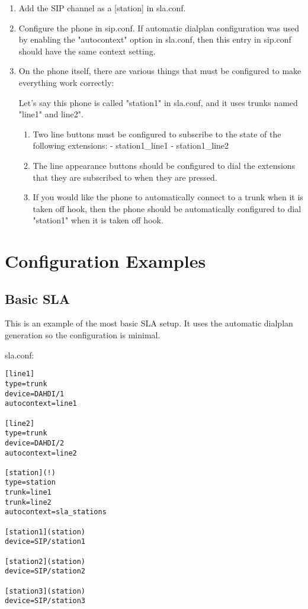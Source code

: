 \begin{enumerate}
\item Add the SIP channel as a [station] in sla.conf.

\item Configure the phone in sip.conf.  If automatic dialplan configuration was
   used by enabling the "autocontext" option in sla.conf, then this entry in
   sip.conf should have the same context setting.

\item On the phone itself, there are various things that must be configured to
   make everything work correctly:

   Let's say this phone is called "station1" in sla.conf, and it uses trunks
   named "line1" and line2".
   \begin{enumerate}

   \item Two line buttons must be configured to subscribe to the state of the
      following extensions:
        - station1\_line1
        - station1\_line2

   \item The line appearance buttons should be configured to dial the extensions
      that they are subscribed to when they are pressed.

   \item If you would like the phone to automatically connect to a trunk when it
      is taken off hook, then the phone should be automatically configured to
      dial "station1" when it is taken off hook.
	
   \end{enumerate}	
\end{enumerate}


\section{Configuration Examples}
\subsection{Basic SLA}

This is an example of the most basic SLA setup.  It uses the automatic
dialplan generation so the configuration is minimal.

sla.conf:
\begin{astlisting}
\begin{verbatim}
[line1]
type=trunk
device=DAHDI/1
autocontext=line1

[line2]
type=trunk
device=DAHDI/2
autocontext=line2

[station](!)
type=station
trunk=line1
trunk=line2
autocontext=sla_stations

[station1](station)
device=SIP/station1

[station2](station)
device=SIP/station2

[station3](station)
device=SIP/station3
\end{verbatim}
\end{astlisting}

